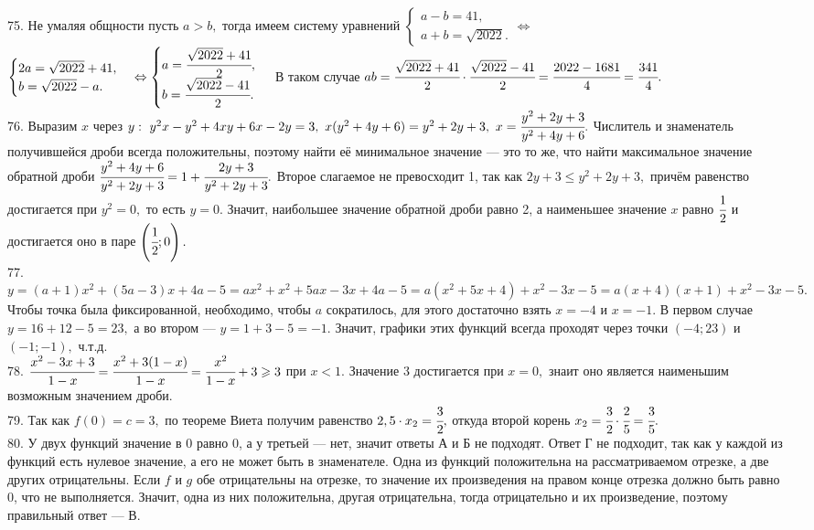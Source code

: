 75. Не умаляя общности пусть $a>b,$ тогда имеем систему уравнений $\begin{cases} a-b=41,\\ a+b=\sqrt{2022}.\end{cases}\Leftrightarrow$\\$ \begin{cases} 2a=\sqrt{2022}+41,\\ b=\sqrt{2022}-a.\end{cases}\Leftrightarrow\begin{cases} a=\cfrac{\sqrt{2022}+41}{2},\\ b=\cfrac{\sqrt{2022}-41}{2}.\end{cases}$ В таком случае $ab=\cfrac{\sqrt{2022}+41}{2}\cdot\cfrac{\sqrt{2022}-41}{2}=\cfrac{2022-1681}{4}=\cfrac{341}{4}.$\\
76. Выразим $x$ через $y:\ y^2x-y^2+4xy+6x-2y=3,\ x(y^2+4y+6)=y^2+2y+3,\ x=\cfrac{y^2+2y+3}{y^2+4y+6}.$ Числитель и знаменатель получившейся дроби всегда положительны, поэтому найти её минимальное значение --- это то же, что найти максимальное значение обратной дроби $\cfrac{y^2+4y+6}{y^2+2y+3}=1+\cfrac{2y+3}{y^2+2y+3}.$ Второе слагаемое не превосходит 1, так как $2y+3\leqslant y^2+2y+3,$ причём равенство достигается при $y^2=0,$ то есть $y=0.$ Значит, наибольшее значение обратной дроби равно 2, а наименьшее значение $x$ равно $\cfrac{1}{2}$ и достигается оно в паре $\left(\cfrac{1}{2};0\right).$\\
77. $y=(a+1)x^2+(5a-3)x+4a-5=ax^2+x^2+5ax-3x+4a-5=a(x^2+5x+4)+x^2-3x-5=a(x+4)(x+1)+x^2-3x-5.$ Чтобы точка была фиксированной, необходимо, чтобы $a$ сократилось, для этого достаточно взять $x=-4$ и $x=-1.$ В первом случае $y=16+12-5=23,$ а во втором --- $y=1+3-5=-1.$ Значит, графики этих функций всегда проходят через точки $(-4;23)$ и $(-1;-1),$ ч.т.д.\\
78. $\cfrac{x^2-3x+3}{1-x}=\cfrac{x^2+3(1-x)}{1-x}=\cfrac{x^2}{1-x}+3\geqslant3$ при $x<1.$ Значение 3 достигается при $x=0,$ знаит оно является наименьшим возможным значением дроби.\\
79. Так как $f(0)=c=3,$ по теореме Виета получим равенство $2,5\cdot x_2=\cfrac{3}{2},$ откуда второй корень $x_2=\cfrac{3}{2}\cdot\cfrac{2}{5}=\cfrac{3}{5}.$\\
80. У двух функций значение в 0 равно 0, а у третьей --- нет, значит ответы А и Б не подходят. Ответ Г не подходит, так как у каждой из функций есть нулевое значение, а его не может быть в знаменателе. Одна из функций положительна на рассматриваемом отрезке, а две других отрицательны. Если $f$ и $g$ обе отрицательны на отрезке, то значение их произведения на правом конце отрезка должно быть равно 0, что не выполняется. Значит, одна из них положительна, другая отрицательна, тогда отрицательно и их произведение, поэтому правильный ответ --- В.\\
